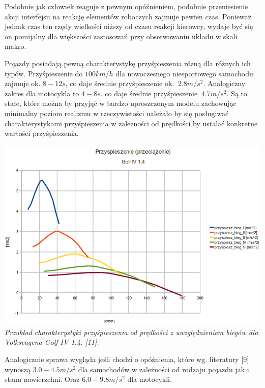 {{{}
\par{
Podobnie jak człowiek reaguje z pewnym opóźnieniem, podobnie przeniesienie akcji interfejsu na reakcję elementów roboczych zajmuje pewien czas. Ponieważ jednak czas ten rzędy wielkości niższy od czasu reakcji kierowcy, wydaje być się on pomijalny dla większości zastosowań przy obserwowaniu układu w skali makro.
}
\par{
Pojazdy posiadają pewną charakterystykę przyśpieszenia różną dla różnych ich typów. Przyśpieszenie do $100km/h$ dla nowoczesnego niesportowego samochodu zajmuje ok. $8-12s$, co daje średnie przyśpieszenie ok. $~2.8m/s^2$. Analogiczny zakres dla motocykla to $4-8s$. co daje średnie przyśpieszenie $~4.7m/s^2$. Są to stałe, które można by przyjąć w bardzo uproszczonym modelu zachowując minimalny poziom realizmu w rzeczywistości należało by się posługiwać charakterystykami przyśpieszenia w zależności od prędkości by ustalać konkretne wartości przyśpieszenia. 
}
\par{
\begin{center}
\includegraphics[width=\textwidth,keepaspectratio]{img/golf_acc}
\textit{Przukład charakterystyki przyśpieszenia od prędkości z uwzględnieniem biegów dla Volksvagena Golf IV 1.4. [11].}
\end{center}
}
\par{
Analogicznie sprawa wygląda jeśli chodzi o opóźnienia, które wg. literatury [9] wynoszą $3.0-4.5m/s^2$ dla samochodów w zależności od rodzaju pojazdu jak i stanu nawierzchni. Oraz $6.0-9.8m/s^2$ dla motocykli.
}
}}
